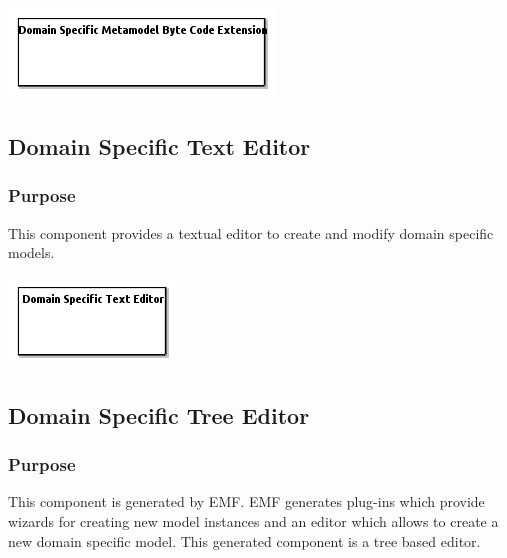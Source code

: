 \documentclass{gemoc} %
\begin{document}

\begin{center}
\includegraphics*[trim=0.0cm 0.0cm 0cm 0.0cm, clip=true]{../images/generated/Generated_Domain_Specific_Metamodel_Byte_Code_Extension.png}
\end{center}




\subsection{Domain Specific Text Editor}
\label{sec:Domain_Specific_Text_Editor}


\subsubsection{Purpose}
This component provides a textual editor to create and modify domain specific models.

\begin{center}
\includegraphics*[trim=0.0cm 0.0cm 0cm 0.0cm, clip=true]{../images/generated/Generated_Domain_Specific_Text_Editor.png}
\end{center}




\subsection{Domain Specific Tree Editor}
\label{sec:Domain_Specific_Tree_Editor}


\subsubsection{Purpose}
This component is generated by EMF. EMF generates plug-ins which provide wizards for creating new model instances and an editor which allows to create a new domain specific model. This generated component is a tree based editor.
\end{document}
